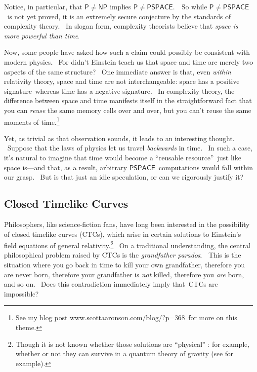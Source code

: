 \documentclass[11pt,onecolumn]{article}%
\begin{document}
Notice, in particular, that $\mathsf{P}\neq\mathsf{NP}$ implies $\mathsf{P\neq
PSPACE}$.\ \ So while $\mathsf{P\neq PSPACE}$\ is not yet proved, it is an
extremely secure conjecture by the standards of complexity theory. \ In slogan
form, complexity theorists believe that \textit{space is more powerful than
time}.

Now, some people have asked how such a claim could possibly be consistent with
modern physics. \ For didn't Einstein teach us that space and time are merely
two aspects of the same structure? \ One immediate answer is that, even
\textit{within} relativity theory, space and time are not interchangeable:
space has a positive signature\ whereas time has a negative signature. \ In
complexity theory, the difference between space and time manifests itself in
the straightforward fact that you can \textit{reuse} the same memory cells
over and over, but you can't reuse the same moments of time.\footnote{See my
blog post www.scottaaronson.com/blog/?p=368\ for more on this theme.}

Yet, as trivial as that observation sounds, it leads to an interesting
thought. \ Suppose that the laws of physics let us travel \textit{backwards
}in time. \ In such a case, it's natural to imagine that time would become a
\textquotedblleft reusable resource\textquotedblright\ just like space
is---and that, as a result, arbitrary $\mathsf{PSPACE}$\ computations would
fall within our grasp. \ But is that just an idle speculation, or can we
rigorously justify it?

\subsection{Closed Timelike Curves\label{CTC}}

Philosophers, like science-fiction fans, have long been interested in the
possibility of closed timelike curves (CTCs), which arise in certain solutions
to Einstein's field equations of general relativity.\footnote{Though it is not
known whether those solutions are \textquotedblleft physical\textquotedblright%
: for example, whether or not they can survive in a quantum theory of gravity
(see \cite{mty} for example).} \ On a traditional understanding, the central
philosophical problem raised by CTCs is the \textit{grandfather paradox}.
\ This is the situation where you go back in time to kill your own
grandfather, therefore you are never born, therefore your grandfather is
\textit{not} killed, therefore you \textit{are} born, and so on. \ Does this
contradiction immediately imply that\ CTCs are impossible?
\end{document}
